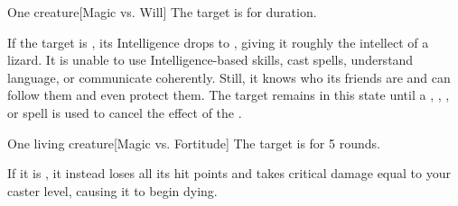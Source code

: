 \begin{spellheader}
    \spellrng{\rngclose}
\end{spellheader}
\begin{spelleffects}
    \begin{spelltarget}{One creature}[Magic vs. Will]
        \spellsuccess The target is \bewildered for \durshort duration.

        If the target is \bloodied, its Intelligence drops to , giving it roughly the intellect of a lizard. It is unable to use Intelligence-based skills, cast spells, understand language, or communicate coherently. Still, it knows who its friends are and can follow them and even protect them. The target remains in this state until a , , , or  spell is used to cancel the effect of the .
    \end{spelltarget}
\end{spelleffects}
\begin{spellfooter}
    
\end{spellfooter}

\begin{spellheader}
    \spellrng{\rngclose}
\end{spellheader}
\begin{spelleffects}
    \begin{spelltarget}{One living creature}[Magic vs. Fortitude]
        \spellsuccess The target is \staggered for 5 rounds.

        If it is \bloodied, it instead loses all its hit points and takes critical damage equal to your caster level, causing it to begin dying.
    \end{spelltarget}
\end{spelleffects}
\begin{spellfooter}
    
\end{spellfooter}

